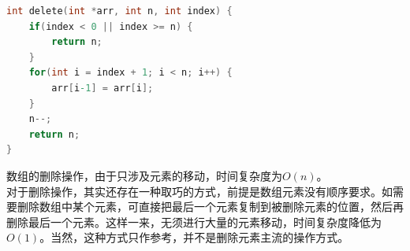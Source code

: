 
\begin{lstlisting}[language=C]
int delete(int *arr, int n, int index) {
    if(index < 0 || index >= n) {
        return n;
    }
    for(int i = index + 1; i < n; i++) {
        arr[i-1] = arr[i];
    }
    n--;
    return n;
}
\end{lstlisting}

数组的删除操作，由于只涉及元素的移动，时间复杂度为$ O(n) $。 \\

对于删除操作，其实还存在一种取巧的方式，前提是数组元素没有顺序要求。如需要删除数组中某个元素，可直接把最后一个元素复制到被删除元素的位置，然后再删除最后一个元素。这样一来，无须进行大量的元素移动，时间复杂度降低为$ O(1) $。当然，这种方式只作参考，并不是删除元素主流的操作方式。

\newpage